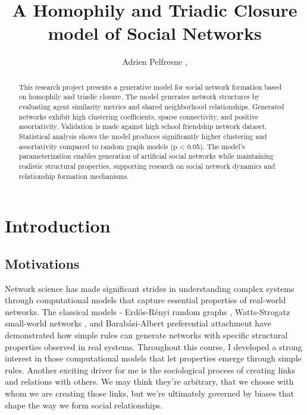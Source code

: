 \documentclass[runningheads]{llncs}
\begin{document}
\title{A Homophily and Triadic Closure model of Social Networks} 

\author{Adrien Pelfresne , } 

\maketitle

\begin{abstract}
This research project presents a generative model for social network formation based on homophily and triadic closure. The model generates network structures by evaluating agent similarity metrics and shared neighborhood relationships. Generated networks exhibit high clustering coefficients, sparse connectivity, and positive assortativity. Validation is made against high school friendship network dataset. Statistical analysis shows the model produces significantly higher clustering and assortativity compared to random graph models (p < 0.05). The model's parameterization enables generation of artificial social networks while maintaining realistic structural properties, supporting research on social network dynamics and relationship formation mechanisms.

\end{abstract}

\section{Introduction}
\subsection{Motivations}
Network science has made significant strides in understanding complex systems through computational models that capture essential properties of real-world networks. The classical models - Erdős-Rényi random graphs \cite{erdos1959random}, Watts-Strogatz small-world networks \cite{watts1998smallworld}, and Barabási-Albert preferential attachment \cite{barabasi1999emergence} have demonstrated how simple rules can generate networks with specific structural properties observed in real systems. Throughout this course, I developed a strong interest in those computational models that let properties emerge through simple rules. Another exciting driver for me is the sociological process of creating links and relations with others. We may think they're arbitrary, that we choose with whom we are creating those links, but we're ultimately governed by biases that shape the way we form social relationships.
\end{document}
